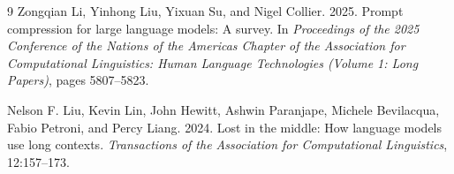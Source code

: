 \documentclass[10pt,a4paper,twocolumn]{article}
\begin{document}
\begin{thebibliography}{9}
Zongqian Li, Yinhong Liu, Yixuan Su, and Nigel Collier. 2025.
\newblock Prompt compression for large language models: A survey.
\newblock In \emph{Proceedings of the 2025 Conference of the Nations of the Americas Chapter of the Association for Computational Linguistics: Human Language Technologies (Volume 1: Long Papers)}, pages 5807--5823.

Nelson F. Liu, Kevin Lin, John Hewitt, Ashwin Paranjape, Michele Bevilacqua, Fabio Petroni, and Percy Liang. 2024.
\newblock Lost in the middle: How language models use long contexts.
\newblock \emph{Transactions of the Association for Computational Linguistics}, 12:157--173.

\end{thebibliography}
\end{document}
